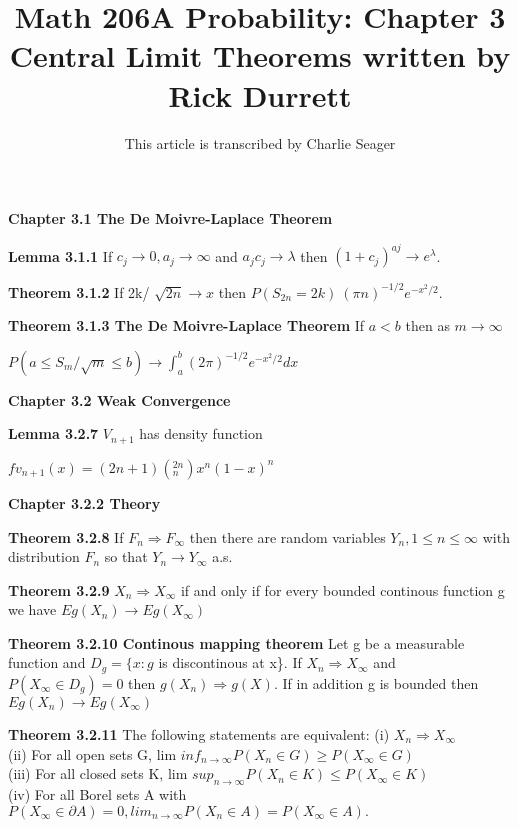 \documentclass{article}
\begin{document}
\title{Math 206A Probability: Chapter 3 Central Limit Theorems written by Rick Durrett}
\author{This article is transcribed by Charlie Seager}

\maketitle

\textbf {Chapter 3.1 The De Moivre-Laplace Theorem}

\textbf {Lemma 3.1.1} If $c_j \rightarrow 0, a_j \rightarrow \infty$ and $a_j c_j \rightarrow \lambda$ then $(1 + c_j)^{aj} \rightarrow e^{\lambda}$.

\textbf {Theorem 3.1.2} If 2k/ $\sqrt{2n} \rightarrow x$ then $P(S_{2n} = 2k) ~ (\pi n)^{-1/2} e^{{-x^2}/2}.$

\textbf {Theorem 3.1.3 The De Moivre-Laplace Theorem} If $a < b$ then as $m \rightarrow \infty$
\begin{center}
$P(a \leq S_m / \sqrt{m} \leq b) \rightarrow \int_{a}^{b} (2\pi)^{-1/2} e^{{-x^2}/2}dx$
\end{center}

\textbf{Chapter 3.2 Weak Convergence}

\textbf {Lemma 3.2.7} $V_{n+1}$ has density function
\begin{center}
$f v_{n+1} (x) = (2n + 1) (^{2n}_n) x^n (1-x)^n$
\end{center}

\textbf {Chapter 3.2.2 Theory}

\textbf{Theorem 3.2.8} If $F_n \Rightarrow F_\infty$ then there are random variables $Y_n, 1 \leq n \leq \infty$ with distribution $F_n$ so that $Y_n \rightarrow Y_\infty$ a.s.

\textbf {Theorem 3.2.9} $X_n \Rightarrow X_\infty$ if and only if for every bounded continous function g we have $Eg(X_n) \rightarrow Eg(X_\infty)$

\textbf {Theorem 3.2.10 Continous mapping theorem} Let g be a measurable function and $D_g = \{x : g$ is discontinous at x\}. If $X_n \Rightarrow X_\infty$ and $P(X_\infty \in D_g) = 0$ then $g(X_n) \Rightarrow g(X)$. If in addition g is bounded then $Eg(X_n) \rightarrow Eg(X_\infty)$

\textbf {Theorem 3.2.11} The following statements are equivalent: (i) $X_n \Rightarrow X_\infty$ \\
(ii) For all open sets G, lim $inf_{n \to \infty} P(X_n \in G) \geq P(X_\infty \in G)$ \\
(iii) For all closed sets K, lim $sup_{n \to \infty} P(X_n \in K) \leq P(X_\infty \in K)$ \\
(iv) For all Borel sets A with $P(X_\infty \in \partial A) = 0, lim_{n \to \infty} P(X_n \in A) = P(X_\infty \in A).$
\end{document}
